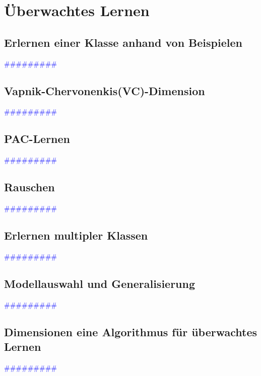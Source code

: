 \documentclass{article}
\begin{document}
\newpage  
\section{Überwachtes Lernen} %
  \subsection{Erlernen einer Klasse anhand von Beispielen} %
      \textcolor{blue}{\#\#\#\#\#\#\#\#\#}
  \subsection{Vapnik-Chervonenkis(VC)-Dimension} %
      \textcolor{blue}{\#\#\#\#\#\#\#\#\#}
  \subsection{PAC-Lernen} %
      \textcolor{blue}{\#\#\#\#\#\#\#\#\#}
  \subsection{Rauschen} %
      \textcolor{blue}{\#\#\#\#\#\#\#\#\#}
  \subsection{Erlernen multipler Klassen} %
      \textcolor{blue}{\#\#\#\#\#\#\#\#\#}
  \subsection{Modellauswahl und Generalisierung} %
      \textcolor{blue}{\#\#\#\#\#\#\#\#\#}
  \subsection{Dimensionen eine Algorithmus für überwachtes Lernen} %
      \textcolor{blue}{\#\#\#\#\#\#\#\#\#}
\end{document}
